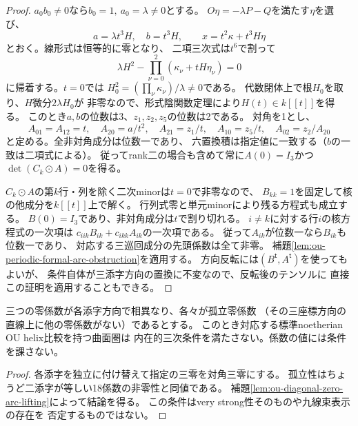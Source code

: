 \begin{proof}
$a_0b_0\ne0$なら$b_0=1,\ a_0=\lambda\ne0$とする。
$O\eta=-\lambda P-Q$を満たす$\eta$を選び、
\[
 a=\lambda t^3 H,\quad b=t^3H,\qquad
 x=t^2\kappa+t^3H\eta
\]
とおく。線形式は恒等的に零となり、
二項三次式は$t^6$で割って
\[
 \lambda H^2-\prod_{\nu=0}^2(\kappa_\nu+tH\eta_\nu)=0
\]
に帰着する。$t=0$では
$H_0^2=(\prod_\nu\kappa_\nu)/\lambda\ne0$である。
代数閉体上で根$H_0$を取り、$H$微分$2\lambda H_0$が
非零なので、形式陰関数定理により$H(t)\in k[[t]]$を得る。
このとき$a,b$の位数は3、$z_1,z_2,z_5$の位数は2である。
対角を1とし、
\[
 A_{01}=A_{12}=t,\quad A_{20}=a/t^2,\quad
 A_{21}=z_1/t,\quad A_{10}=z_5/t,\quad A_{02}=z_2/A_{20}
\]
と定める。全非対角成分は位数一であり、
六置換積は指定値に一致する（$b$の一致は二項式による）。
従ってrank二の場合も含めて常に$A(0)=I_3$かつ
$\det(C_k\odot A)=0$を得る。

$C_k\odot A$の第$k$行・列を除く二次minorは$t=0$で非零なので、
$B_{kk}=1$を固定して核の他成分を$k[[t]]$上で解く。
行列式零と単元minorにより残る方程式も成立する。
$B(0)=I_3$であり、非対角成分は$t$で割り切れる。
$i\ne k$に対する行$i$の核方程式の一次項は
$c_{iik} B_{ik}+c_{ikk} A_{ik}$の一次項である。
従って$A_{ik}$が位数一なら$B_{ik}$も位数一であり、
対応する三巡回成分の先頭係数は全て非零。
補題\ref{lem:ou-periodic-formal-arc-obstruction}を適用する。
方向反転には$(B^{\mathsf t},A^{\mathsf t})$を使ってもよいが、
条件自体が三添字方向の置換に不変なので、反転後のテンソルに
直接この証明を適用することもできる。
\end{proof}

\begin{theorem}[孤立零係数の完全matchingによる内在的排除]
\label{thm:ou-isolated-matching-obstruction}
三つの零係数が各添字方向で相異なり、各々が孤立零係数
（その三座標方向の直線上に他の零係数がない）であるとする。
このとき対応する標準noetherian OU helix比較を持つ曲面圏は
内在的三次条件を満たさない。係数の値には条件を課さない。
\end{theorem}
\begin{proof}
各添字を独立に付け替えて指定の三零を対角三零にする。
孤立性はちょうど二添字が等しい18係数の非零性と同値である。
補題\ref{lem:ou-diagonal-zero-arc-lifting}によって結論を得る。
この条件はvery strong性そのものや九線束表示の存在を
否定するものではない。
\end{proof}

